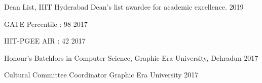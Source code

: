 



\begin{cvhonors}

  \cvhonor
    {Dean List, IIIT Hyderabad} %
    {Dean’s list awardee for academic excellence.} %
    {} %
    {2019} %

  \cvhonor
    {GATE} %
    {Percentile : 98} %
    {} %
    {2017} %
    
   \cvhonor
    {IIIT-PGEE} %
    {AIR : 42} %
    {} %
    {2017} %
    
    \cvhonor
    {Honour's} %
    {Batchlors in Computer Science, Graphic Era University, Dehradun} %
    {} %
    {2017} %



\end{cvhonors}




\begin{cvhonors}


  \cvhonor
    {Cultural Committee Coordinator} %
    {Graphic Era University} %
    {} %
    {2017} %

\end{cvhonors}


